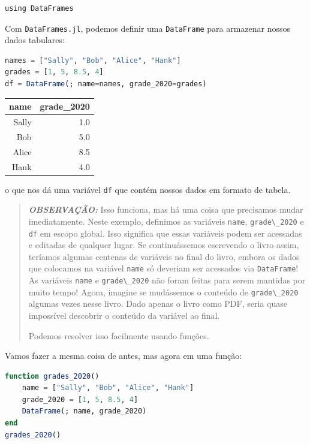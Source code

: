 \documentclass[
  notoc %
]{tufte-book}
\newcommand{\passthrough}[1]{#1}
\begin{document}
\begin{lstlisting}
using DataFrames
\end{lstlisting}

Com \passthrough{\lstinline!DataFrames.jl!}, podemos definir uma
\passthrough{\lstinline!DataFrame!} para armazenar nossos dados
tabulares:

\begin{lstlisting}[language=Julia]
names = ["Sally", "Bob", "Alice", "Hank"]
grades = [1, 5, 8.5, 4]
df = DataFrame(; name=names, grade_2020=grades)
\end{lstlisting}

\begin{longtable}[]{@{}rr@{}}
\toprule
name & grade\_2020 \\
\midrule
\endhead
Sally & 1.0 \\
Bob & 5.0 \\
Alice & 8.5 \\
Hank & 4.0 \\
\bottomrule
\end{longtable}

o que nos dá uma variável \passthrough{\lstinline!df!} que contém nossos
dados em formato de tabela.

\begin{quote}
\textbf{\emph{OBSERVAÇÃO:}} Isso funciona, mas há uma coisa que
precisamos mudar imediatamente. Neste exemplo, definimos as variáveis
\passthrough{\lstinline!name!}, \passthrough{\lstinline!grade\_2020!} e
\passthrough{\lstinline!df!} em escopo global. Isso significa que essas
variáveis podem ser acessadas e editadas de qualquer lugar. Se
continuássemos escrevendo o livro assim, teríamos algumas centenas de
variáveis no final do livro, embora os dados que colocamos na variável
\passthrough{\lstinline!name!} só deveriam ser acessados via
\passthrough{\lstinline!DataFrame!}! As variáveis
\passthrough{\lstinline!name!} e \passthrough{\lstinline!grade\_2020!}
não foram feitas para serem mantidas por muito tempo! Agora, imagine se
mudássemos o conteúdo de \passthrough{\lstinline!grade\_2020!} algumas
vezes nesse livro. Dado apenas o livro como PDF, seria quase impossível
descobrir o conteúdo da variável ao final.

Podemos resolver isso facilmente usando funções.
\end{quote}

Vamos fazer a mesma coisa de antes, mas agora em uma função:

\begin{lstlisting}[language=Julia]
function grades_2020()
    name = ["Sally", "Bob", "Alice", "Hank"]
    grade_2020 = [1, 5, 8.5, 4]
    DataFrame(; name, grade_2020)
end
grades_2020()
\end{lstlisting}
\end{document}
